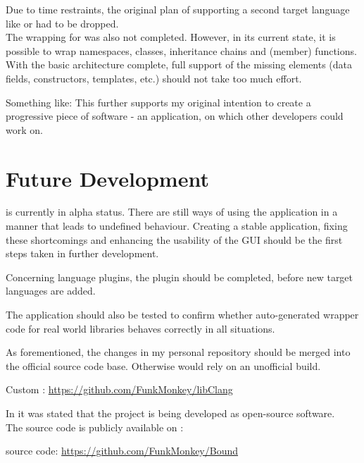 Due to time restraints, the original plan of supporting a second target language like  or  had to be dropped.\\ The wrapping for  was also not completed. However, in its current state, it is possible to wrap namespaces, classes, inheritance chains and (member) functions.\\
With the basic architecture complete, full support of the missing elements (data fields, constructors, templates, etc.) should not take too much effort. 


Something like: This further supports my original intention to create a progressive piece of software - an application, on which other developers could work on.

\chapter{Future Development}
\label{chap:FutureDevelopment}

 is currently in alpha status. There are still ways of using the application in a manner that leads to undefined behaviour. Creating a stable application, fixing these shortcomings and enhancing the usability of the GUI should be the first steps taken in further development.

Concerning language plugins, the  plugin should be completed, before new target languages are added.

The application should also be tested to confirm whether auto-generated wrapper code for real world libraries behaves correctly in all situations.

As forementioned, the changes in my personal  repository should be merged into the official source code base. Otherwise  would rely on an unofficial  build.

\hspace{20pt} Custom : \url{https://github.com/FunkMonkey/libClang}

In  it was stated that the project is being developed as open-source software.\\
The source code is publicly available on :

\hspace{20pt}  source code: \url{https://github.com/FunkMonkey/Bound}

